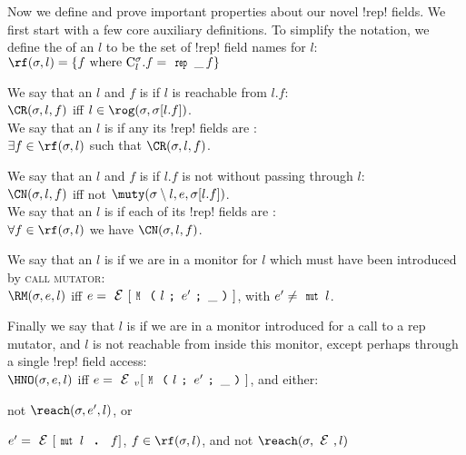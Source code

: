 Now we define and prove important properties about our novel \Q!rep! fields. We first start with a few core auxiliary definitions.
To simplify the notation, we define the \rf of an $l$ to be the set of \Q!rep! field names for $l$:\\
\indent $\rf(\s,l) = \{f  \text{ where } \C{l}.f = \field{\Kw{rep}}{\_}{f}\}$
\LS

\noindent We say that an $l$ and $f$ is \CR if $l$ is reachable from $l.f$:\\
\indent $\CR(\s, l, f)$ iff $l \in \rog(\s, \s[l.f])$.\\
\noindent We say that an $l$ is \RCR if any its \Q!rep! fields are \CR:\\
\indent $\exists f \in \rf(\s,l)$ such that $\CR(\s, l, f)$.
\LS

\noindent We say that an $l$ and $f$ is \CN if $l.f$ is not \muty without passing through $l$:\\
\indent $\CN(\s, l, f)$ iff not $\muty(\s\setminus l, e, \s[l.f])$.\\
\noindent We say that an $l$ is \RCN if each of its \Q!rep! fields are \CN:\\
\indent $\forall f \in \rf(\s,l)$ we have $\CN(\s, l, f)$.
\LS
%

\noindent We say that an $l$ is \RM if we are in a monitor for $l$ which must have been introduced by \textsc{call mutator}:\\
\indent $\RM(\s, e, l)$ iff $e = \E[\M{l}{e'}{\_}]$, with $e' \neq \Kw{mut}\,l$.
\LS 

\noindent Finally we say that $l$ is \HNO if we are in a monitor introduced for a call to a rep mutator, and $l$ is not reachable from inside this monitor, except perhaps through a single \Q!rep! field access:\\
\indent $\HNO(\s, e, l)$ iff $e = \EV[\M{l}{e'}{\_}]$, and either:
\begin{iitemize}
\item not $\reach(\s, e', l)$, or\SS
\item $e' = \E[\Kw{mut}\,l\D f]$, $f \in \rf(\s,l)$, and not $\reach(\s, \E, l)$
\end{iitemize}

